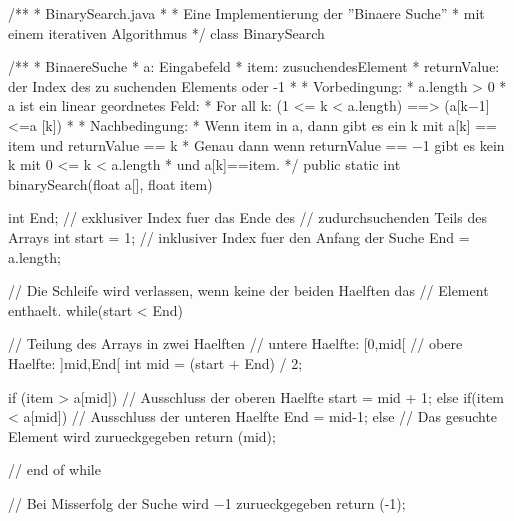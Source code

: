 \documentclass{bschlangaul-aufgabe}
\begin{document}
%

\bigskip



\begin{bJavaAngabe}
/**
 * BinarySearch.java
 *
 * Eine Implementierung der ”Binaere Suche”
 * mit einem iterativen Algorithmus
 */
class BinarySearch {

  /**
   * BinaereSuche
   * a: Eingabefeld
   * item: zusuchendesElement
   * returnValue: der Index des zu suchenden Elements oder -1
   *
   * Vorbedingung:
   * a.length > 0
   * a ist ein linear geordnetes Feld:
   * For all k: (1 <= k < a.length) ==> (a[k−1] <=a [k])
   *
   * Nachbedingung:
   * Wenn item in a, dann gibt es ein k mit a[k] == item und returnValue == k
   * Genau dann wenn returnValue == −1 gibt es kein k mit 0 <= k < a.length
   * und a[k]==item.
   */
  public static int binarySearch(float a[], float item) {

    int End;  // exklusiver Index fuer das Ende des
              // zudurchsuchenden Teils des Arrays
    int start = 1; // inklusiver Index fuer den Anfang der Suche
    End = a.length;

    // Die Schleife wird verlassen, wenn keine der beiden Haelften das
    // Element enthaelt.
    while(start < End) {

      // Teilung des Arrays in zwei Haelften
      // untere Haelfte: [0,mid[
      // obere Haelfte: ]mid,End[
      int mid = (start + End) / 2;

      if (item > a[mid]) {
        // Ausschluss der oberen Haelfte
        start = mid + 1;
      } else if(item < a[mid]) {
        // Ausschluss der unteren Haelfte
        End = mid-1;
      } else {
        // Das gesuchte Element wird zurueckgegeben
        return (mid);
      }
    } // end of while

    // Bei Misserfolg der Suche wird −1 zurueckgegeben
    return (-1);
  }
}
\end{bJavaAngabe}
\end{document}
